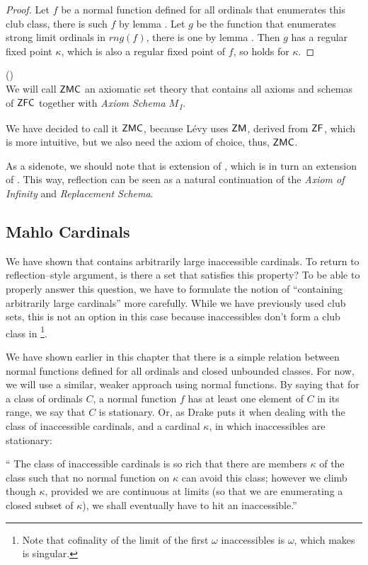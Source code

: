 \begin{proof}
Let $f$ be a normal function defined for all ordinals that enumerates this club class, there is such $f$ by lemma . 
Let $g$ be the function that enumerates strong limit ordinals in $rng(f)$, there is one by lemma . 
Then $g$ has a regular fixed point $\kappa$, which is also a regular fixed point of $f$, so  holds for $\kappa$.
\end{proof}

\begin{definition}{()}\\
We will call $\sf{ZMC}$ an axiomatic set theory that contains all axioms and schemas of $\sf{ZFC}$ together with \emph{Axiom Schema $M$\textsubscript{1}}.
\end{definition}
We have decided to call it $\sf{ZMC}$, because Lévy uses $\sf{ZM}$, derived from $\sf{ZF}$, which is more intuitive, but we also need the axiom of choice, thus, $\sf{ZMC}$.

As a sidenote, we should note that  is extension of , which is in turn an extension of . 
This way, reflection can be seen as a natural continuation of the \emph{Axiom of Infinity} and \emph{Replacement Schema}. %

\subsection{Mahlo Cardinals}
We have shown that  contains arbitrarily large inaccessible cardinals. To return to reflection–style argument, is there a set that satisfies this property? To be able to properly answer this question, we have to formulate the notion of ``containing arbitrarily large cardinals'' more carefully. While we have previously used club sets, this is not an option in this case because inaccessibles don't form a club class in \footnote{Note that cofinality of the limit of the first $\omega$ inaccessibles is $\omega$, which makes is singular.}. %

We have shown earlier in this chapter that there is a simple relation between normal functions defined for all ordinals and closed unbounded classes.
For now, we will use a similar, weaker approach using normal functions.
By saying that for a class of ordinals $C$, a normal function $f$ has at least one element of $C$ in its range, we say that $C$ is stationary. 
Or, as Drake puts it when dealing with the class of inaccessible cardinals, and a cardinal $\kappa$, in which inaccessibles are stationary:
\begin{displayquote}
`` The class of inaccessible cardinals is so rich that there are members $\kappa$ of the class such that no normal function on $\kappa$ can avoid this class; however we climb though $\kappa$, provided we are continuous at limits (so that we are enumerating a closed subset of $\kappa$), we shall eventually have to hit an inaccessible.''
\end{displayquote}

